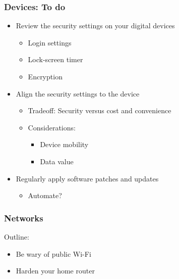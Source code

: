 \documentclass[blue]{beamer}
\begin{document}
\begin{frame}
\frametitle{Devices: To do}

\begin{itemize}
  \item Review the security settings on your digital devices
  \begin{itemize}
    \item Login settings
    \item Lock-screen timer
    \item Encryption
  \end{itemize}
  \item Align the security settings to the device
  \begin{itemize}
    \item Tradeoff: Security versus cost and convenience
    \item Considerations:
    \begin{itemize}
      \item Device mobility
      \item Data value
    \end{itemize}
  \end{itemize}
  \item Regularly apply software patches and updates
  \begin{itemize}
    \item Automate?
  \end{itemize}
\end{itemize}

\end{frame}



\begin{frame}
\frametitle{Networks}

\begin{block}{Outline:}
\begin{itemize}
  \item Be wary of public Wi-Fi
  \item Harden your home router
\end{itemize}
\end{block}

\end{frame}
\end{document}

